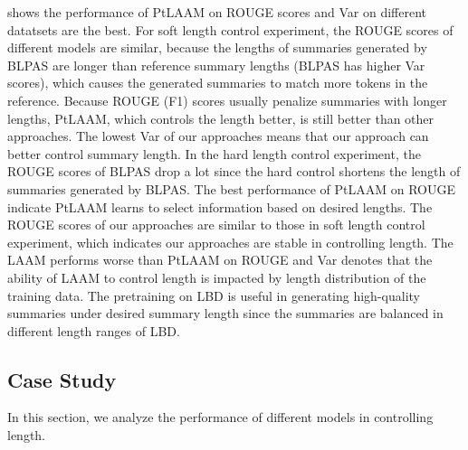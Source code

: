  shows the performance of PtLAAM on ROUGE scores and 
Var on different datatsets are the best.
For soft length control experiment,
the ROUGE scores of different models are similar,
because the lengths of summaries generated by BLPAS
are longer than reference summary lengths (BLPAS has higher Var scores), which causes the generated summaries 
to match more tokens in the reference.
Because ROUGE (F1) scores usually penalize summaries with longer lengths, 
PtLAAM, which controls the length better, is still better than other approaches.
The lowest Var of our approaches means that our approach can 
better control summary length.
In the hard length control experiment, the ROUGE scores of BLPAS drop a lot 
since the hard control shortens the length of summaries generated by BLPAS.
The best performance of PtLAAM on ROUGE indicate PtLAAM learns to select 
information based on desired lengths.
The ROUGE scores of our approaches are similar to those in 
soft length control experiment, which indicates our approaches are stable in controlling length.
The LAAM performs worse than PtLAAM on ROUGE and Var denotes that 
the ability of LAAM to control length is impacted by 
length distribution of the training data.
The pretraining on LBD is useful in 
generating high-quality summaries under desired summary length 
since the summaries are balanced in different length ranges of LBD.

\subsection{Case Study}
\label{sec:appendix}
In this section, we analyze the performance of different models in controlling length.

